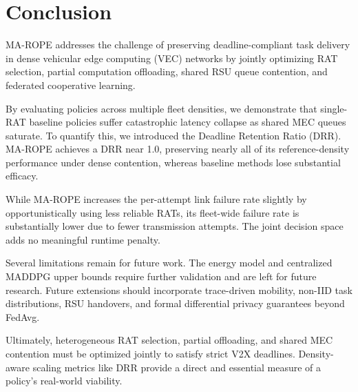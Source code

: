\section{Conclusion}

MA-ROPE addresses the challenge of preserving deadline-compliant task delivery in dense vehicular edge computing (VEC) networks by jointly optimizing RAT selection, partial computation offloading, shared RSU queue contention, and federated cooperative learning. 

By evaluating policies across multiple fleet densities, we demonstrate that single-RAT baseline policies suffer catastrophic latency collapse as shared MEC queues saturate. To quantify this, we introduced the Deadline Retention Ratio (DRR). MA-ROPE achieves a DRR near 1.0, preserving nearly all of its reference-density performance under dense contention, whereas baseline methods lose substantial efficacy.

While MA-ROPE increases the per-attempt link failure rate slightly by opportunistically using less reliable RATs, its fleet-wide failure rate is substantially lower due to fewer transmission attempts. The joint decision space adds no meaningful runtime penalty.

Several limitations remain for future work. The energy model and centralized MADDPG upper bounds require further validation and are left for future research. Future extensions should incorporate trace-driven mobility, non-IID task distributions, RSU handovers, and formal differential privacy guarantees beyond FedAvg.

Ultimately, heterogeneous RAT selection, partial offloading, and shared MEC contention must be optimized jointly to satisfy strict V2X deadlines. Density-aware scaling metrics like DRR provide a direct and essential measure of a policy's real-world viability.

